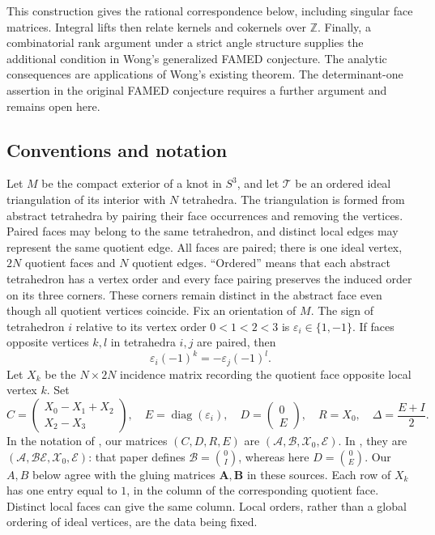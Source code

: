\documentclass[11pt]{article}
\theoremstyle{definition}\newtheorem{definition}[theorem]{Definition}
\theoremstyle{remark}\newtheorem{remark}[theorem]{Remark}
\DeclareMathOperator{\diag}{diag}
\newcommand{\Z}{\mathbb Z}
\newcommand{\eps}{\varepsilon}
\begin{document}
This construction gives the rational correspondence below, including singular face matrices. Integral lifts then relate kernels and cokernels over $\Z$. Finally, a combinatorial rank argument under a strict angle structure supplies the additional condition in Wong's generalized FAMED conjecture. The analytic consequences are applications of Wong's existing theorem. The determinant-one assertion in the original FAMED conjecture requires a further argument and remains open here.

\subsection{Conventions and notation}
Let $M$ be the compact exterior of a knot in $S^3$, and let $\mathcal T$ be an ordered ideal triangulation of its interior with $N$ tetrahedra. The triangulation is formed from abstract tetrahedra by pairing their face occurrences and removing the vertices. Paired faces may belong to the same tetrahedron, and distinct local edges may represent the same quotient edge. All faces are paired; there is one ideal vertex, $2N$ quotient faces and $N$ quotient edges. ``Ordered'' means that each abstract tetrahedron has a vertex order and every face pairing preserves the induced order on its three corners. These corners remain distinct in the abstract face even though all quotient vertices coincide. Fix an orientation of $M$. The sign of tetrahedron $i$ relative to its vertex order $0<1<2<3$ is $\eps_i\in\{1,-1\}$. If faces opposite vertices $k,l$ in tetrahedra $i,j$ are paired, then
\begin{equation}\eps_i(-1)^k=-\eps_j(-1)^l.\label{eq:facesign}\end{equation}
Let $X_k$ be the $N\times2N$ incidence matrix recording the quotient face opposite local vertex $k$. Set
\begin{equation}
 C=\begin{pmatrix}X_0-X_1+X_2\\X_2-X_3\end{pmatrix},\quad
 E=\diag(\eps_i),\quad D=\begin{pmatrix}0\\E\end{pmatrix},\quad R=X_0,
 \quad \Delta=\frac{E+I}{2}.\label{eq:face}
\end{equation}
In the notation of \cite{BW,Wong}, our matrices $(C,D,R,E)$ are $(\mathscr A,\mathscr B,\mathscr X_0,\mathscr E)$. In \cite{BGW}, they are $(\mathcal A,\mathcal B\mathcal E,\mathcal X_0,\mathcal E)$: that paper defines $\mathcal B=\binom{0}{I}$, whereas here $D=\binom{0}{E}$. Our $A,B$ below agree with the gluing matrices $\mathbf A,\mathbf B$ in these sources. Each row of $X_k$ has one entry equal to $1$, in the column of the corresponding quotient face. Distinct local faces can give the same column. Local orders, rather than a global ordering of ideal vertices, are the data being fixed.
\end{document}
